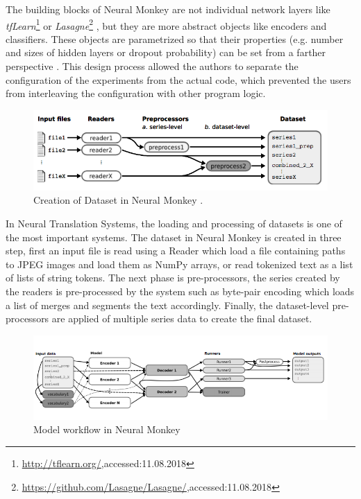 The building blocks of Neural Monkey are not individual network layers like \textit{tfLearn}\footnote{\url{http://tflearn.org/},accessed:11.08.2018} or \textit{Lasagne}\footnote{\url{https://github.com/Lasagne/Lasagne/},accessed:11.08.2018} , but they are more abstract objects like encoders and classifiers. These objects are parametrized so that their properties (e.g. number and sizes of hidden layers or dropout probability) can be set from a farther perspective \citep{neuralmonk}. This design process allowed the authors to separate the configuration of the experiments from the actual code, which prevented the users from interleaving the configuration with other program logic. 

\begin{figure}
\includegraphics[width=\textwidth]{figures/nmonkey2.png}
\caption{ Creation of Dataset in Neural Monkey \citep{neuralmonk}.} \label{fignm2}
\end{figure}

In Neural Translation Systems, the loading and processing of datasets is one of the most important systems. The dataset in Neural Monkey is created in three step, first an input file is read using a Reader which load a file containing paths to JPEG images and load them as NumPy arrays, or read tokenized text as a list of lists of string tokens. The next phase is pre-processors, the series created by the readers is pre-processed by the system such as byte-pair encoding \citep{P16-1162} which loads a list of merges and segments the text accordingly. Finally, the dataset-level pre-processors are applied of multiple series data to create the final dataset. 

\begin{figure}
\includegraphics[width=\textwidth]{figures/nmonkey1.png}
\caption{ Model workflow in Neural Monkey \citep{neuralmonk}} \label{fignm1}
\end{figure}


